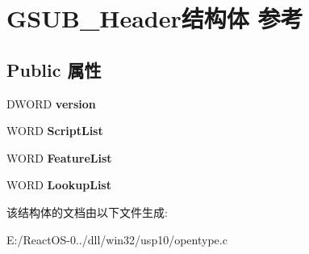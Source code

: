 \hypertarget{struct_g_s_u_b___header}{}\section{G\+S\+U\+B\+\_\+\+Header结构体 参考}
\label{struct_g_s_u_b___header}
\subsection*{Public 属性}
\begin{DoxyCompactItemize}
\item 
\mbox{\label{struct_g_s_u_b___header_ae72368a5dc0efdadc963e34c3bcf169f}} 
D\+W\+O\+RD {\bfseries version}
\item 
\mbox{\label{struct_g_s_u_b___header_a6c0690b3e7a69d78eeb3c4800536c1d7}} 
W\+O\+RD {\bfseries Script\+List}
\item 
\mbox{\label{struct_g_s_u_b___header_a215bd313f23d3bec9ef5850713ba5db8}} 
W\+O\+RD {\bfseries Feature\+List}
\item 
\mbox{\label{struct_g_s_u_b___header_a4995dd436aab42abeaf237d3a73b5e1a}} 
W\+O\+RD {\bfseries Lookup\+List}
\end{DoxyCompactItemize}


该结构体的文档由以下文件生成\+:\begin{DoxyCompactItemize}
\item 
E\+:/\+React\+O\+S-\/0../dll/win32/usp10/opentype.\+c\end{DoxyCompactItemize}
